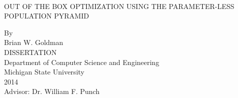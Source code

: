 \documentclass[12pt,letterpaper]{report}
\newcommand{\MyTitle}{\MakeUppercase{Out of the Box Optimization using the Parameter-less Population Pyramid}}
\begin{document}
\sloppy


\begin{titlepage}
\begin{center}
\ \\[1in]%
\MyTitle\\
\begin{doublespace}
By\\ %
Brian W. Goldman\\[4.5 in]%
DISSERTATION\\

Department of Computer Science and Engineering\\
Michigan State University\\
2014\\
Advisor: Dr. William F. Punch\\%
 \end{doublespace}
\end{center}
\end{titlepage}
\newpage







%
%
%
%
\end{document}
